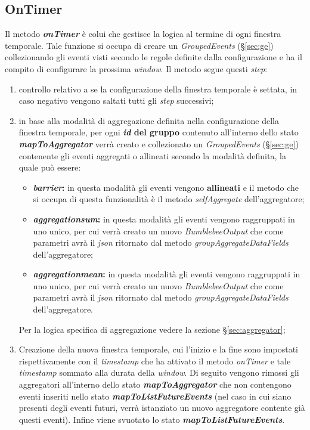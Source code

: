 \subsection{OnTimer}\label{sec:on-timer-windowing}
Il metodo \textbf{\textit{onTimer}} è colui che gestisce la logica al termine di ogni finestra temporale. Tale funzione si occupa di creare un \textit{GroupedEvents} (\S\ref{sec:ge}) collezionando gli eventi visti secondo le regole definite dalla configurazione e ha il compito di configurare la prossima \textit{window}. Il metodo segue questi \textit{step}:
\begin{enumerate}
	\item{controllo relativo a se la configurazione della finestra temporale è settata, in caso negativo vengono saltati tutti gli \textit{step} successivi;}
	\item{in base alla modalità di aggregazione definita nella configurazione della finestra temporale, per ogni \textbf{\textit{id} del gruppo} contenuto all'interno dello stato \textbf{\textit{mapToAggregator}} verrà creato e collezionato un \textit{GroupedEvents} (\S\ref{sec:ge}) contenente gli eventi aggregati o allineati secondo la modalità definita, la quale può essere:
	\begin{itemize}
		\item{\textbf{\textit{barrier}:} in questa modalità gli eventi vengono \textbf{allineati} e il metodo che si occupa di questa funzionalità è il metodo \textit{selfAggregate} dell'aggregatore;}
		\item{\textbf{\textit{aggregation\textunderscore sum}:} in questa modalità gli eventi vengono raggruppati in uno unico, per cui verrà creato un nuovo \textit{BumblebeeOutput} che come parametri avrà il \textit{\gls{json}} ritornato dal metodo \textit{groupAggregateDataFields} dell'aggregatore;}
		\item{\textbf{\textit{aggregation\textunderscore mean}:} in questa modalità gli eventi vengono raggruppati in uno unico, per cui verrà creato un nuovo \textit{BumblebeeOutput} che come parametri avrà il \textit{\gls{json}} ritornato dal metodo \textit{groupAggregateDataFields} dell'aggregatore.}
	\end{itemize}
	Per la logica specifica di aggregazione vedere la sezione \S\ref{sec:aggregator};}
	\item{Creazione della nuova finestra temporale, cui l'inizio e la fine sono impostati rispettivamente con il \textit{\gls{timestamp}} che ha attivato il metodo \textit{onTimer} e tale \textit{\gls{timestamp}} sommato alla durata della \textit{window}. Di seguito vengono rimossi gli aggregatori all'interno dello stato \textbf{\textit{mapToAggregator}} che non contengono eventi inseriti nello stato \textbf{\textit{mapToListFutureEvents}} (nel caso in cui siano presenti degli eventi futuri, verrà istanziato un nuovo aggregatore contente già questi eventi). Infine viene svuotato lo stato \textbf{\textit{mapToListFutureEvents}}.
	}
\end{enumerate}





